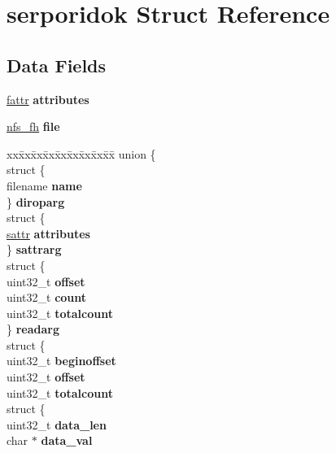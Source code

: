 \hypertarget{structserporidok}{}\section{serporidok Struct Reference}
\label{structserporidok}
\subsection*{Data Fields}
\begin{DoxyCompactItemize}
\item 
\mbox{\label{structserporidok_af5d778ee589854d3cc41c921260b7a15}} 
\mbox{\hyperlink{structfattr}{fattr}} {\bfseries attributes}
\item 
\mbox{\label{structserporidok_ac5c4a99b93f89478edced0c28855447c}} 
\mbox{\hyperlink{structnfs__fh}{nfs\+\_\+fh}} {\bfseries file}
\item 
\mbox{\label{structserporidok_afb49a00f26ba6da8101cd2a0f342b29b}} 
\begin{tabbing}
xx\=xx\=xx\=xx\=xx\=xx\=xx\=xx\=xx\=\kill
union \{\\
\>struct \{\\
\>\>filename {\bfseries name}\\
\>\} {\bfseries diroparg}\\
\>struct \{\\
\>\>\mbox{\hyperlink{structsattr}{sattr}} {\bfseries attributes}\\
\>\} {\bfseries sattrarg}\\
\>struct \{\\
\>\>uint32\_t {\bfseries offset}\\
\>\>uint32\_t {\bfseries count}\\
\>\>uint32\_t {\bfseries totalcount}\\
\>\} {\bfseries readarg}\\
\>struct \{\\
\>\>uint32\_t {\bfseries beginoffset}\\
\>\>uint32\_t {\bfseries offset}\\
\>\>uint32\_t {\bfseries totalcount}\\
\>\>struct \{\\
\>\>\>uint32\_t {\bfseries data\_len}\\
\>\>\>char $\ast$ {\bfseries data\_val}\\

\end{tabbing}
\end{DoxyCompactItemize}
